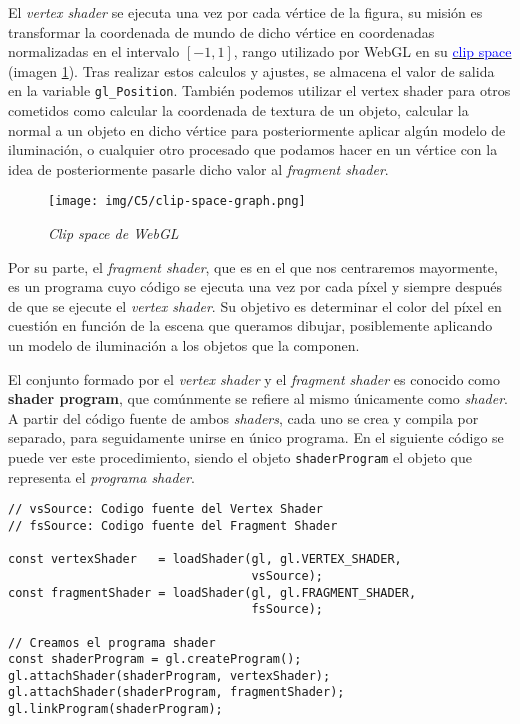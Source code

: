 El \textit{vertex shader} se ejecuta una vez por cada vértice de la figura, su misión es transformar la coordenada de mundo de dicho vértice en coordenadas normalizadas en el intervalo $[-1,1]$, rango utilizado por WebGL en su \href{https://developer.mozilla.org/en-US/docs/Web/API/WebGL_API/WebGL_model_view_projection#clip_space}{\textcolor{blue}{clip space}} (imagen \ref{fig:clipspace}). Tras realizar estos calculos y ajustes, se almacena el valor de salida en la variable \verb|gl_Position|. También podemos utilizar el vertex shader para otros cometidos como calcular la coordenada de textura de un objeto, calcular la normal a un objeto en dicho vértice para posteriormente aplicar algún modelo de iluminación, o cualquier otro procesado que podamos hacer en un vértice con la idea de posteriormente pasarle dicho valor al \textit{fragment shader}.


\begin{figure} [ht]
    \centering
    \texttt{[image: img/C5/clip-space-graph.png]}
    \caption{\textit{Clip space de WebGL}}
    \label{fig:clipspace}
\end{figure}

Por su parte, el \textit{fragment shader}, que es en el que nos centraremos mayormente, es un programa cuyo código se ejecuta una vez por cada píxel y siempre después de que se ejecute el \textit{vertex shader}. Su objetivo es determinar el color del píxel en cuestión en función de la escena que queramos dibujar, posiblemente aplicando un modelo de iluminación a los objetos que la componen.

El conjunto formado por el \textit{vertex shader} y el \textit{fragment shader} es conocido como \textbf{shader program}, que comúnmente se refiere al mismo únicamente como \textit{shader}. A partir del código fuente de ambos \textit{shaders}, cada uno se crea y compila por separado, para seguidamente unirse en único programa. En el siguiente código se puede ver este procedimiento, siendo el objeto \verb|shaderProgram| el objeto que representa el \textit{programa shader}.

\begin{lstlisting}
// vsSource: Codigo fuente del Vertex Shader
// fsSource: Codigo fuente del Fragment Shader

const vertexShader   = loadShader(gl, gl.VERTEX_SHADER, 
                                  vsSource);
const fragmentShader = loadShader(gl, gl.FRAGMENT_SHADER, 
                                  fsSource);
  
// Creamos el programa shader
const shaderProgram = gl.createProgram();
gl.attachShader(shaderProgram, vertexShader);
gl.attachShader(shaderProgram, fragmentShader);
gl.linkProgram(shaderProgram);
\end{lstlisting}

